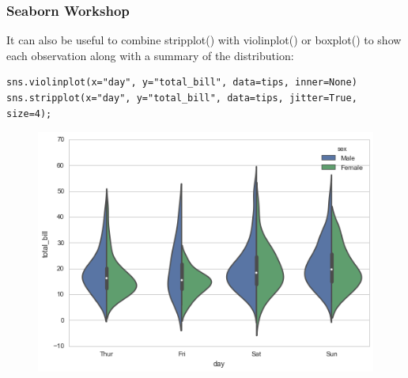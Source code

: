 \documentclass{beamer}
\begin{document}
\begin{frame}[fragile]
	\frametitle{Seaborn Workshop}
It can also be useful to combine stripplot() with violinplot() or boxplot() to show each observation along with a summary of the distribution:
\begin{verbatim}
sns.violinplot(x="day", y="total_bill", data=tips, inner=None)
sns.stripplot(x="day", y="total_bill", data=tips, jitter=True, size=4);
\end{verbatim}
\begin{figure}
\centering
\includegraphics[width=0.7\linewidth]{images/categorical_27_0}
\end{figure}


\end{frame}
\end{document}
